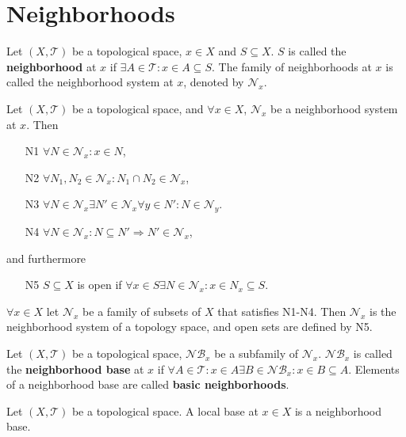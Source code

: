 \documentclass[12pt]{book}
\begin{document}
\section{Neighborhoods}

\begin{definition}
	Let $(X,\mathcal T)$ be a topological space, $x\in X$ and $S\subseteq X$. $S$ is called the {\bf neighborhood} at $x$ if $\exists A\in \mathcal T: x\in A\subseteq S$. The family of neighborhoods at $x$ is called the neighborhood system at $x$, denoted by $\mathcal N_x$.
\end{definition}

\begin{theorem}
	Let $(X,\mathcal T)$ be a topological space, and $\forall x\in X$, $\mathcal N_x$ be a neighborhood system at $x$. Then
	\begin{enumerate}
		\item [N1] $\forall N\in \mathcal N_x:x\in N$,
		\item [N2] $\forall N_1,N_2\in \mathcal N_x: N_1\cap N_2\in \mathcal N_x$,
		\item [N3] $\forall N\in \mathcal N_x\exists N'\in \mathcal N_x\forall y\in N':N\in \mathcal N_y$.
		\item [N4] $\forall N\in \mathcal N_x:N\subseteq N'\Rightarrow N'\in \mathcal N_x$,
	\end{enumerate}
	and furthermore
	\begin{enumerate}
		\item[N5] $S\subseteq X$ is open if $\forall x\in S\exists N\in \mathcal N_x:x\in N_x\subseteq S$.
	\end{enumerate}
	
	$\forall x\in X$ let $\mathcal N_x$ be a family of subsets of $X$ that satisfies N1-N4. Then $\mathcal N_x$ is the neighborhood system of a topology space, and open sets are defined by N5.
\end{theorem}

\begin{definition}
	Let $(X,\mathcal T)$ be a topological space, $\mathcal {NB}_x$ be a subfamily of $\mathcal N_x$. $\mathcal {NB}_x$ is called the {\bf neighborhood base} at $x$ if $\forall A\in \mathcal T:x\in A\exists B\in \mathcal {NB}_x: x\in B\subseteq A$. Elements of a neighborhood base are called {\bf basic neighborhoods}.
\end{definition}

\begin{theorem}
	Let $(X,\mathcal T)$ be a topological space. A local base at $x\in X$ is a neighborhood base.
\end{theorem}
\end{document}
